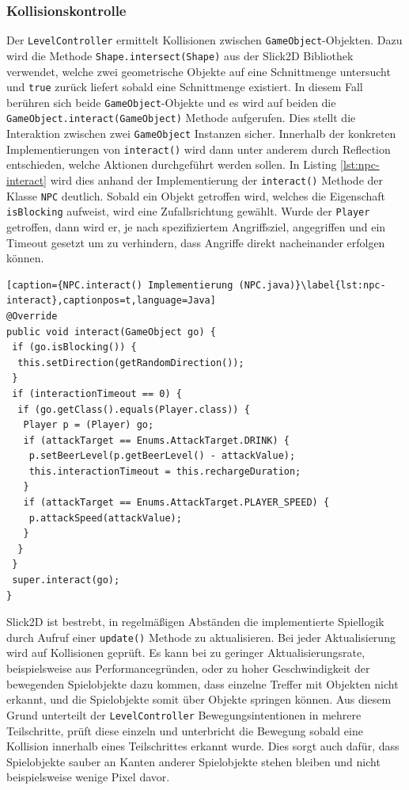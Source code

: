 \subsubsection{Kollisionskontrolle}
Der \texttt{LevelController} ermittelt Kollisionen zwischen \texttt{GameObject}-Objekten.
Dazu wird die Methode \texttt{Shape.intersect(Shape)} aus der Slick2D Bibliothek verwendet, welche zwei geometrische Objekte auf eine Schnittmenge untersucht und \texttt{true} zurück liefert sobald eine Schnittmenge existiert.
In diesem Fall berühren sich beide \texttt{GameObject}-Objekte und es wird auf beiden die \texttt{GameObject.interact(GameObject)} Methode aufgerufen.
Dies stellt die Interaktion zwischen zwei \texttt{GameObject} Instanzen sicher.
Innerhalb der konkreten Implementierungen von \texttt{interact()} wird dann unter anderem durch Reflection entschieden, welche Aktionen durchgeführt werden sollen.
In Listing \ref{lst:npc-interact} wird dies anhand der Implementierung der \texttt{interact()} Methode der Klasse \texttt{NPC} deutlich.
Sobald ein Objekt getroffen wird, welches die Eigenschaft \texttt{isBlocking} aufweist, wird eine Zufallsrichtung gewählt.
Wurde der \texttt{Player} getroffen, dann wird er, je nach spezifiziertem Angriffsziel, angegriffen und ein Timeout gesetzt um zu verhindern, dass Angriffe direkt nacheinander erfolgen können.

\begin{lstlisting}[caption={NPC.interact() Implementierung (NPC.java)}\label{lst:npc-interact},captionpos=t,language=Java]
@Override
public void interact(GameObject go) {
 if (go.isBlocking()) {
  this.setDirection(getRandomDirection());
 }
 if (interactionTimeout == 0) {
  if (go.getClass().equals(Player.class)) {
   Player p = (Player) go;
   if (attackTarget == Enums.AttackTarget.DRINK) {
    p.setBeerLevel(p.getBeerLevel() - attackValue);
    this.interactionTimeout = this.rechargeDuration;
   }
   if (attackTarget == Enums.AttackTarget.PLAYER_SPEED) {
    p.attackSpeed(attackValue);
   }
  }
 }
 super.interact(go);
}

\end{lstlisting}

Slick2D ist bestrebt, in regelmäßigen Abständen die implementierte Spiellogik durch Aufruf einer \texttt{update()} Methode zu aktualisieren.
Bei jeder Aktualisierung wird auf Kollisionen geprüft.
Es kann bei zu geringer Aktualisierungsrate, beispielsweise aus Performancegründen, oder zu hoher Geschwindigkeit der bewegenden Spielobjekte dazu kommen, dass einzelne Treffer mit Objekten nicht erkannt, und die Spielobjekte somit über Objekte springen können.
Aus diesem Grund unterteilt der \texttt{LevelController} Bewegungsintentionen in mehrere Teilschritte, prüft diese einzeln und unterbricht die Bewegung sobald eine Kollision innerhalb eines Teilschrittes erkannt wurde.
Dies sorgt auch dafür, dass Spielobjekte sauber an Kanten anderer Spielobjekte stehen bleiben und nicht beispielsweise wenige Pixel davor.



